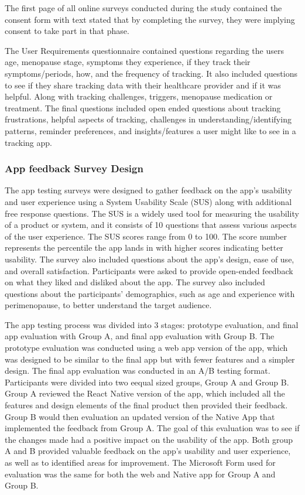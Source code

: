 The first page of all online surveys conducted during the study contained the consent form with text stated that by completing the survey, they were implying consent to take part in that phase. 

The User Requirements questionnaire contained questions regarding the users age, menopause stage, symptoms they experience, if they track their symptoms/periods, how, and the frequency of tracking. It also included questions to see if they share tracking data with their healthcare provider and if it was helpful. Along with tracking challenges, triggers, menopause medication or treatment. The final questions included open ended questions about tracking frustrations, helpful aspects of tracking, challenges in understanding/identifying patterns, reminder preferences, and insights/features a user might like to see in a tracking app. 

\subsubsection{App feedback Survey Design} 

The app testing surveys were designed to gather feedback on the app's usability and user experience using a System Usability Scale (SUS) along with additional free response questions. The SUS is a widely used tool for measuring the usability of a product or system, and it consists of 10 questions that assess various aspects of the user experience. The SUS scores range from 0 to 100. The score number represents the percentile the app lands in with higher scores indicating better usability. The survey also included questions about the app's design, ease of use, and overall satisfaction. Participants were asked to provide open-ended feedback on what they liked and disliked about the app. The survey also included questions about the participants' demographics, such as age and experience with perimenopause, to better understand the target audience.

The app testing process was divided into 3 stages: prototype evaluation, and final app evaluation with Group A, and final app evaluation with Group B. The prototype evaluation was conducted using a web app version of the app, which was designed to be similar to the final app but with fewer features and a simpler design. The final app evaluation was conducted in an A/B testing format. Participants were divided into two eequal sized groups, Group A and Group B. Group A
reviewed the React Native version of the app, which included all the features and design elements of the final product then provided their feedback. Group B would then evaluation an updated version of the Native App that implemented the feedback from Group A. The goal of this evaluation was to see if the changes made had a positive impact on the usability of the app. Both group A and B provided valuable feedback on the app's usability and user experience, as well as to identified areas for improvement. The Microsoft Form used for evaluation was the same for both the web and Native app for Group A and Group B. 
 

